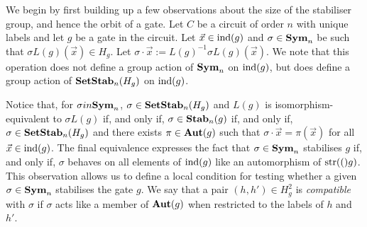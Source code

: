 \documentclass[../paper.tex]{subfiles}
\begin{document}
We begin by first building up a few observations about the size of the
stabiliser group, and hence the orbit of a gate. Let $C$ be a circuit of order
$n$ with unique labels and let $g$ be a gate in the circuit. Let $\vec{x} \in
\text{\upshape ind}(g)$ and $\sigma \in \text{\textbf{Sym}}_n$ be such that $\sigma L(g)(\vec{x}) \in H_g$.
Let $\sigma \cdot \vec{x} := L(g)^{-1}\sigma L(g)(\vec{x})$. We note that this
operation does not define a group action of $\text{\textbf{Sym}}_n$ on $\text{\upshape ind}(g)$, but does
define a group action of $\text{\textbf{SetStab}}_n(H_g)$ on $\text{\upshape ind}(g)$.

Notice that, for $\sigma in \text{\textbf{Sym}}_n$, $\sigma \in \text{\textbf{SetStab}}_n(H_g)$ and $L(g)$ is
isomorphism-equivalent to $\sigma L(g)$ if, and only if, $\sigma \in \text{\textbf{Stab}}_n(g)$
if, and only if, $\sigma \in \text{\textbf{SetStab}}_n(H_g)$ and there exists $\pi \in \text{\textbf{Aut}}(g)$
such that $\sigma \cdot \vec{x} = \pi (\vec{x})$ for all $\vec{x} \in \text{\upshape ind}(g)$.
The final equivalence expresses the fact that $\sigma \in \text{\textbf{Sym}}_n$ stabilises $g$
if, and only if, $\sigma$ behaves on all elements of $\text{\upshape ind}(g)$ like an
automorphism of $\text{str}(()g)$. This observation allows us to define a local
condition for testing whether a given $\sigma \in \text{\textbf{Sym}}_n$ stabilises the gate
$g$. We say that a pair $(h, h') \in H^{2}_g$ is \emph{compatible} with $\sigma$
if $\sigma$ acts like a member of $\text{\textbf{Aut}}(g)$ when restricted to the labels of $h$
and $h'$.




\end{document}
